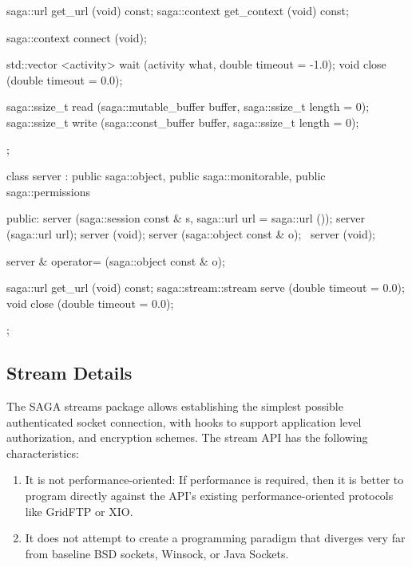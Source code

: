 \begin{mycode}[label=Prototypes: saga::stream]
{{{          saga::url     get_url     (void) const;
          saga::context get_context (void) const;

          saga::context connect     (void);

          std::vector <activity>
                        wait        (activity       what, 
                                     double         timeout = -1.0);
          void          close       (double         timeout =  0.0);

          saga::ssize_t read        (saga::mutable_buffer buffer, 
                                     saga::ssize_t        length  = 0);
          saga::ssize_t write       (saga::const_buffer   buffer, 
                                     saga::ssize_t        length  = 0);
      };

      class server 
          : public saga::object,
            public saga::monitorable,
            public saga::permissions
      {
        public:
        server (saga::session const & s, 
                saga::url            url = saga::url ());
        server (saga::url            url);
        server (void);
        server (saga::object const & o);
       ~server (void);

        server & operator= (saga::object const & o);

        saga::url            get_url (void) const;
        saga::stream::stream serve   (double timeout = 0.0);
        void                 close   (double timeout = 0.0);
      };
    }
  }
\end{mycode}


 \subsection{Stream Details}

  The SAGA streams package allows establishing the simplest
  possible authenticated socket connection, with hooks to
  support application level authorization, and encryption
  schemes.  The stream API has the following characteristics:

  \begin{enumerate}

    \item It is not performance-oriented:  If performance is
    required, then it is better to program directly against the
    API's existing performance-oriented protocols like GridFTP
    or XIO.  

    \item It does not attempt to create a programming paradigm
    that diverges very far from baseline BSD sockets, Winsock,
    or Java Sockets.

  \end{enumerate}

